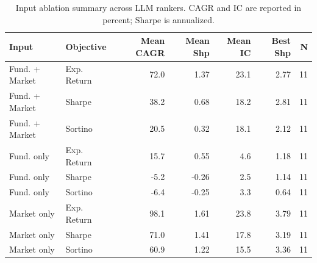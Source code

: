 \begin{table}[t]
\centering
\caption{Input ablation summary across LLM rankers. CAGR and IC are reported in percent; Sharpe is annualized.}
\label{tab:input-ablation}
\small
\begin{tabular}{llrrrrr}
\toprule
\textbf{Input} & \textbf{Objective} & \textbf{Mean CAGR} & \textbf{Mean Shp} & \textbf{Mean IC} & \textbf{Best Shp} & \textbf{N} \\
\midrule
Fund. + Market & Exp. Return & 72.0 & 1.37 & 23.1 & 2.77 & 11 \\
Fund. + Market & Sharpe & 38.2 & 0.68 & 18.2 & 2.81 & 11 \\
Fund. + Market & Sortino & 20.5 & 0.32 & 18.1 & 2.12 & 11 \\
Fund. only & Exp. Return & 15.7 & 0.55 & 4.6 & 1.18 & 11 \\
Fund. only & Sharpe & -5.2 & -0.26 & 2.5 & 1.14 & 11 \\
Fund. only & Sortino & -6.4 & -0.25 & 3.3 & 0.64 & 11 \\
Market only & Exp. Return & 98.1 & 1.61 & 23.8 & 3.79 & 11 \\
Market only & Sharpe & 71.0 & 1.41 & 17.8 & 3.19 & 11 \\
Market only & Sortino & 60.9 & 1.22 & 15.5 & 3.36 & 11 \\
\bottomrule
\end{tabular}
\end{table}

